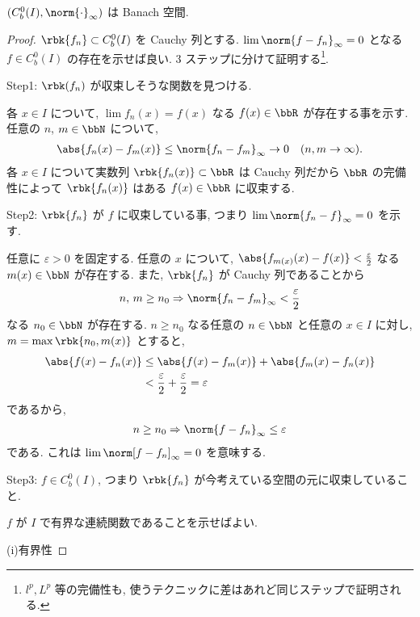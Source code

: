 \documentclass[openany, a4paper, oneside]{jsbook}
\begin{document}
\begin{thm}
 $(C^0_b(I), \norm{\cdot}_{\infty})$ は Banach 空間.
\end{thm}
\begin{proof}
$\rbk{f_n} \subset C^0_b(I)$ を Cauchy 列とする.
$\lim \norm{f - f_n}_{\infty} = 0$ となる $f \in C^0_b(I)$ の存在を示せば良い.
3 ステップに分けて証明する\footnote{ $l^p, L^p$ 等の完備性も, 使うテクニックに差はあれど同じステップで証明される.}.

\textsf{Step1}: $\rbk(f_n)$ が収束しそうな関数を見つける.

各 $x \in I$ について, $\lim f_n(x)=f(x)$ なる $f(x) \in \bbR$ が存在する事を示す.
任意の $n$, $m \in \bbN$ について,
\begin{align*}
 \abs{f_n(x) - f_m(x)}
 \leq
 \norm{f_n - f_m}_{\infty} \to 0 \quad (n, m \to \infty).
\end{align*}
各 $x \in I$ について実数列 $\rbk{f_n(x)} \subset \bbR$ は Cauchy 列だから
$\bbR$ の完備性によって $\rbk{f_n(x)}$ はある $f(x) \in \bbR$ に収束する.

\textsf{Step2}: $\rbk{f_n}$ が $f$ に収束している事, つまり $\lim \norm{f_n - f}_{\infty} = 0$ を示す.

任意に $\varepsilon > 0$ を固定する.
任意の $x$ について, $\abs{f_{m(x)}(x)- f (x)} < \frac{\varepsilon}{2}$ なる $m(x) \in \bbN$ が存在する.
また, $\rbk{f_n}$ が Cauchy 列であることから
\begin{align*}
 n, \,  m
 \geq
 n_0
 \Rightarrow
 \norm{f_n - f_m}_{\infty}
 <
 \frac{\varepsilon}{2}
\end{align*}
なる $n_0 \in \bbN$ が存在する.
$n \geq n_0$ なる任意の $n \in \bbN$ と任意の $x \in I$ に対し,
$m = \max \rbk{n_0, m(x)}$ とすると,
\begin{align*}
 \abs{f(x) - f_n(x)}
 &\leq
 \abs{f(x) - f_m(x)} + \abs{f_m(x) - f_n(x)} \\
 &<
 \frac{\varepsilon}{2} + \frac{\varepsilon}{2}
 =
 \varepsilon
\end{align*}
であるから,
\begin{align*}
 n
 \geq
 n_0
 \Rightarrow
 \norm{f - f_n}_{\infty}
 \leq
 \varepsilon
\end{align*}
である.
これは $\lim \norm[f - f_n]_{\infty} = 0$ を意味する.

\textsf{Step3}: $f \in C^0_b(I)$, つまり $\rbk{f_n}$ が今考えている空間の元に収束していること.

$f$ が $I$ で有界な連続関数であることを示せばよい.

(i)有界性


\end{proof}
\end{document}
